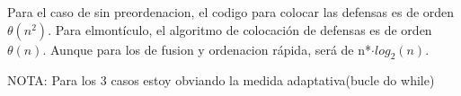 Para el caso de sin preordenacion, el codigo para colocar las defensas es de orden $\theta(n^2)$.
Para elmontículo, el algoritmo de colocación de defensas es de orden $\theta(n)$.
Aunque para los de fusion y ordenacion rápida, será de  n*$\cdot log_{2}(n)$.

NOTA: Para los 3 casos estoy obviando la medida adaptativa(bucle do while)
